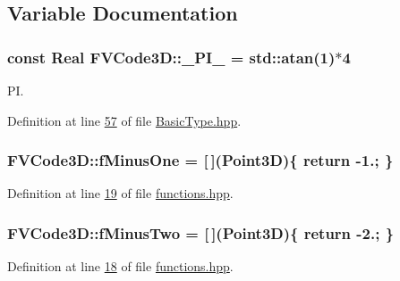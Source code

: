 \subsection{Variable Documentation}
\subsubsection[{\texorpdfstring{\+\_\+\+P\+I\+\_\+}{_PI_}}]{\setlength{\rightskip}{0pt plus 5cm}const {\bf Real} F\+V\+Code3\+D\+::\+\_\+\+P\+I\+\_\+ = std\+::atan(1)$\ast$4}\hypertarget{namespaceFVCode3D_a10917df7e49a48239ce5f00ec9bbfe0a}{}\label{namespaceFVCode3D_a10917df7e49a48239ce5f00ec9bbfe0a}


PI. 



Definition at line \hyperlink{BasicType_8hpp_source_l00057}{57} of file \hyperlink{BasicType_8hpp_source}{Basic\+Type.\+hpp}.

\subsubsection[{\texorpdfstring{f\+Minus\+One}{fMinusOne}}]{ F\+V\+Code3\+D\+::f\+Minus\+One = \mbox{[}$\,$\mbox{]}({\bf Point3D})\{ return -\/1.; \}}\hypertarget{namespaceFVCode3D_a2ce53aebcf9d64490c1d10fff4860a75}{}\label{namespaceFVCode3D_a2ce53aebcf9d64490c1d10fff4860a75}


Definition at line \hyperlink{functions_8hpp_source_l00019}{19} of file \hyperlink{functions_8hpp_source}{functions.\+hpp}.

\subsubsection[{\texorpdfstring{f\+Minus\+Two}{fMinusTwo}}]{ F\+V\+Code3\+D\+::f\+Minus\+Two = \mbox{[}$\,$\mbox{]}({\bf Point3D})\{ return -\/2.; \}}\hypertarget{namespaceFVCode3D_aafe19d9d844e6d7ec5cc316a921b91ea}{}\label{namespaceFVCode3D_aafe19d9d844e6d7ec5cc316a921b91ea}


Definition at line \hyperlink{functions_8hpp_source_l00018}{18} of file \hyperlink{functions_8hpp_source}{functions.\+hpp}.

